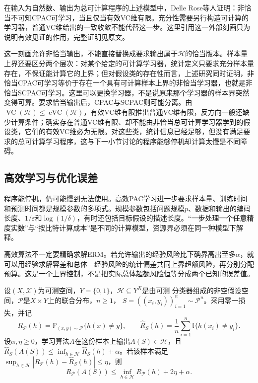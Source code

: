 在输入为自然数、输出为总可计算程序的上述模型中，Delle Rose等人证明：非恰当不可知CPAC可学习，当且仅当有效VC维有限。充分性需要另行构造可计算的学习器，普通VC维给出的一致收敛不能代替这一步。这里引用这一外部刻画只为说明有效见证的作用，完整证明见原文。

这一刻画允许非恰当输出，不能直接替换成要求输出属于$\mathcal H$的恰当版本。样本量上界还要区分两个层次：对某个给定的可计算学习器，统计定义只要求充分样本量存在，不保证能计算它的上界；但对假设类的存在性而言，上述研究同时证明，非恰当CPAC可学习等价于存在一个具有可计算样本上界的非恰当学习器，也就是非恰当SCPAC可学习。这里可以更换学习器，不是说原来那个学习器的样本界突然变得可算。要求恰当输出后，CPAC与SCPAC则可能分离。由$\operatorname{VC}(\mathcal H)\leq\operatorname{eVC}(\mathcal H)$，有效VC维有限推出普通VC维有限，反方向一般还缺少计算条件；确实存在普通VC维有限、却不能由非恰当总可计算学习器学到的假设类，它们的有效VC维必为无限。对这些类，统计信息已经足够，但没有满足要求的总可计算学习程序，这与下一小节讨论的程序能够停机却计算太慢是不同障碍。

\subsection{高效学习与优化误差}

程序能停机，仍可能慢到无法使用。高效PAC学习进一步要求样本量、训练时间和预测时间都是规模参数的多项式。规模参数包括问题规模$p$、数据和输出的编码长度、$1/\varepsilon$和$\log(1/\delta)$，有时还包括目标假设的描述长度。“一步处理一个任意精度实数”与“按比特计算成本”是不同的计算模型，资源界必须在同一种模型下解释。

高效算法不一定要精确求解ERM。若允许输出的经验风险比下确界高出至多$\alpha$，就可以用经验求解容差和总体—经验风险的统计偏差共同上界超额风险，再分别分配预算。这是一个上界控制，不是把实际总体超额风险恒等分成两个已知的误差值。

\begin{theorem}[近似ERM的期望风险保证]
\label{thm:approximate-erm-risk}
设$(X,\mathcal X)$为可测空间，$Y=\{0,1\}$，$\mathcal H\subseteq Y^X$是由可测
分类器组成的非空假设空间，$\mathcal P$是$X\times Y$上的联合分布，$n\geq1$，
$S=((x_i,y_i))_{i=1}^n\sim\mathcal P^n$。采用零一损失，并记
\[
 R_{\mathcal P}(h)=\mathbb P_{(x,y)\sim\mathcal P}\{h(x)\neq y\},\qquad
 \hat R_S(h)=\frac1n\sum_{i=1}^n\mathbb I\{h(x_i)\neq y_i\}.
\]
设$\alpha,\eta\geq0$，学习算法$A$在这份样本上输出$A(S)\in\mathcal H$，且
$\hat R_S(A(S))\leq\inf_{h\in\mathcal H}\hat R_S(h)+\alpha$。若该样本满足
$\sup_{h\in\mathcal H}|R_{\mathcal P}(h)-\hat R_S(h)|\leq\eta$，则
\[
 R_{\mathcal P}(A(S))
 \leq\inf_{h\in\mathcal H}R_{\mathcal P}(h)+2\eta+\alpha.
\]
\end{theorem}

